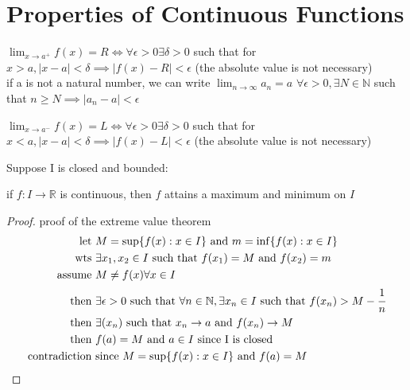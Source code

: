 \documentclass{article}
\begin{document}
\section{Properties of Continuous Functions}
\begin{definition}  
    $\lim_{x \to a^{+}} f(x) = R \iff \forall \epsilon > 0 \exists \delta > 0$ such that  for $x > a, |x - a| < \delta \implies |f(x) - R| < \epsilon$ (the absolute value is not necessary) \\ 
    if a is not a natural number, we can write $\lim_{n \to \infty} a_n = a$ $\forall \epsilon > 0, \exists N \in \mathbb{N}$ such that $n \geq N \implies |a_n - a| < \epsilon$
\end{definition}
\begin{definition} 
    $\lim_{x \to a^{-}} f(x) = L \iff \forall \epsilon > 0 \exists \delta > 0$ such that  for $x < a, |x - a| < \delta \implies |f(x) - L| < \epsilon$ (the absolute value is not necessary) \\
    
\end{definition}
Suppose I is closed and bounded: 
\begin{theorem}
    if $f: I \to \mathbb{R}$ is continuous, then $f$ attains a maximum and minimum on $I$
\end{theorem}
\begin{proof}proof of the extreme value theorem
    \begin{align*}
        \text{let } &M = \sup\{f(x) : x \in I\} \text{ and } m = \inf\{f(x) : x \in I\} \\ 
        \text{wts } &\exists x_1, x_2 \in I \text{ such that } f(x_1) = M \text{ and } f(x_2) = m \\ 
        \text{assume } &M \neq f(x) \forall x \in I \\ 
        \text{then } &\exists \epsilon > 0 \text{ such that } \forall n \in \mathbb{N}, \exists x_n \in I \text{ such that } f(x_n) > M - \cfrac{1}{n} \\ 
        \text{then } &\exists (x_n) \text{ such that } x_n \to a \text{ and } f(x_n) \to M \\ 
        \text{then } &f(a) = M \text{ and } a \in I \text{ since I is closed} \\ 
        \text{contradiction } &\text{since } M = \sup\{f(x) : x \in I\} \text{ and } f(a) = M
    \end{align*}
\end{proof}
\end{document}
